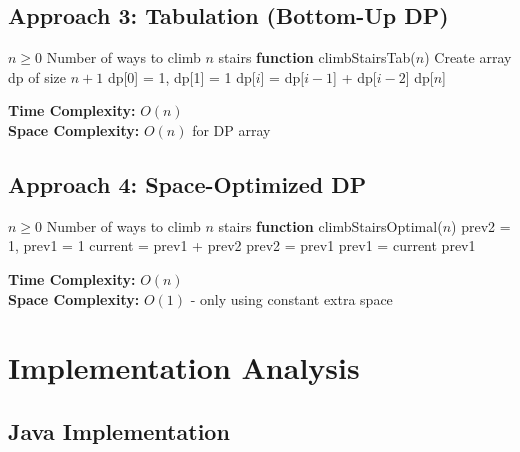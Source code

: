 \documentclass[12pt,a4paper]{article}
\begin{document}
\subsection{Approach 3: Tabulation (Bottom-Up DP)}

\begin{algorithm}
\caption{Climbing Stairs - Tabulation}
\begin{algorithmic}
\REQUIRE $n \geq 0$
\ENSURE Number of ways to climb $n$ stairs
\STATE \textbf{function} climbStairsTab($n$)
\ENDIF
\STATE Create array dp of size $n+1$
\STATE dp[0] = 1, dp[1] = 1
    \STATE dp[$i$] = dp[$i-1$] + dp[$i-2$]
\ENDFOR
\RETURN dp[$n$]
\end{algorithmic}
\end{algorithm}

\textbf{Time Complexity:} $O(n)$ \\
\textbf{Space Complexity:} $O(n)$ for DP array

\subsection{Approach 4: Space-Optimized DP}

\begin{algorithm}
\caption{Climbing Stairs - Space Optimized}
\begin{algorithmic}
\REQUIRE $n \geq 0$
\ENSURE Number of ways to climb $n$ stairs
\STATE \textbf{function} climbStairsOptimal($n$)
\ENDIF
\STATE prev2 = 1, prev1 = 1
    \STATE current = prev1 + prev2
    \STATE prev2 = prev1
    \STATE prev1 = current
\ENDFOR
\RETURN prev1
\end{algorithmic}
\end{algorithm}

\textbf{Time Complexity:} $O(n)$ \\
\textbf{Space Complexity:} $O(1)$ - only using constant extra space

\section{Implementation Analysis}

\subsection{Java Implementation}
\end{document}
